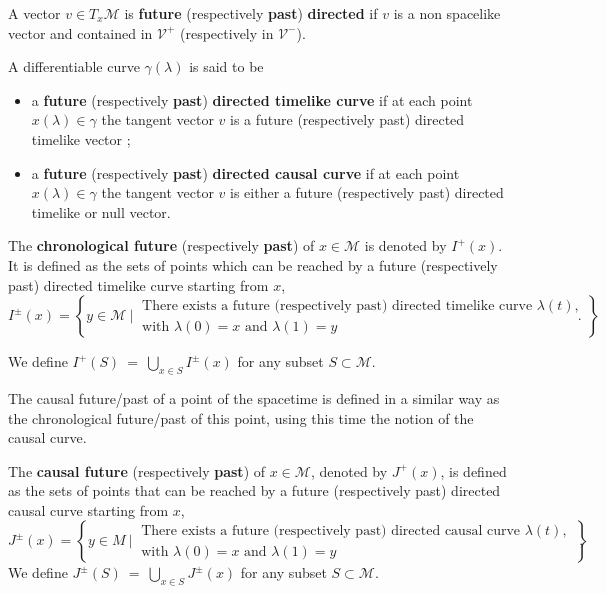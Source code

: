 \documentclass[10pt]{book}
\newcommand{\Mcal}{\mathcal{M}}
\newcommand{\Vcal}{\mathcal{V}}
\theoremstyle{break}
\newtheorem{definition}{Definition}
\begin{document}
A vector $v \in T_x\Mcal$ is \textbf{future} (respectively \textbf{past}) \textbf{directed} if $v$ is a non spacelike vector and contained in $\Vcal^+$ (respectively in $\Vcal^-$). 


\bigskip


A differentiable curve $\gamma(\lambda)$ is said to be 
\begin{itemize}
\item a \textbf{future} (respectively \textbf{past}) \textbf{directed timelike curve} if at each point $x(\lambda) \in \gamma$ the tangent vector $v$ is a future (respectively past) directed timelike vector ;
\item a \textbf{future} (respectively \textbf{past}) \textbf{directed causal curve} if at each point $x(\lambda) \in \gamma$ the tangent vector $v$ is either a future (respectively past) directed timelike or null vector. 
\end{itemize}

\bigskip

The \textbf{chronological future} (respectively \textbf{past}) of $x \in \Mcal$ is denoted by $I^{+}(x)$. It is defined as the sets of points which can be reached by a future (respectively past) directed timelike curve starting from $x$,
%
\begin{equation*}
I^{\pm}(x) = \left\{ y \in \Mcal \ \bigg| \ \begin{array}{l} \text{There exists a future (respectively past) directed timelike curve $\lambda(t)$,} \\ \text{with $\lambda(0)=x$ and $\lambda(1)=y$} \end{array} \ \right\}.
\end{equation*}

We define $I^{+}(S) \ = \ \bigcup_{x \in S} I^{\pm}(x)$ for any subset $S \subset \Mcal$.
%

\bigskip

The causal future/past of a point of the spacetime is defined in a similar way as the chronological future/past of this point, using this time the notion of the causal curve.

\bigskip

%
The \textbf{causal future} (respectively \textbf{past}) of $x \in \Mcal$, denoted by $J^{+}(x)$, is defined as the sets of points that can be reached by a future (respectively past) directed causal curve starting from $x$,
%
\begin{equation*}
J^{\pm}(x) = \left\{ y \in M \ \bigg| \ \begin{array}{l} \text{There exists a future (respectively past) directed causal curve $\lambda(t)$,} \\ \text{with $\lambda(0)=x$ and $\lambda(1)=y$} \end{array} \; \right\},
\end{equation*}
We define $J^{\pm}(S) \ = \ \bigcup_{x \in S} J^{\pm}(x)$ for any subset $S \subset \Mcal$.
%
\end{document}
